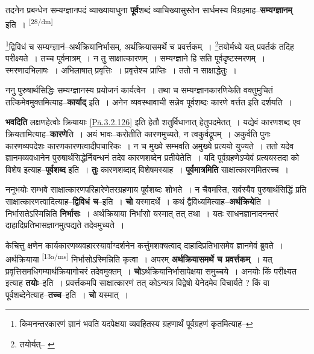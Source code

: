 \documentclass[article,12pt,a4paper]{memoir}
\begin{document}
	  \pstart तदनेन प्रबन्धेन सम्यग्ज्ञानपदं व्याख्यायाधुना \textbf{पूर्व}शब्दं व्याचिख्यासुस्तेन सार्धमस्य विग्रहमाह--\textbf{सम्यग्ज्ञानम्} इति ।
	\pend
      \leavevmode\textsuperscript{\rmlatinfont\tiny [28/dm]}

	  \pstart \footnote{किमनन्तरकारणं ज्ञानं भवति यदपेक्षया व्यवहितस्य ग्रहणार्थं पूर्वग्रहणं कृतमित्याह--\cite{dp-msD-n}}द्विविधं च सम्यग्ज्ञानं--अर्थक्रियानिर्भासम्, अर्थक्रियासमर्थे च प्रवर्त्तकम् । \footnote{तयोर्यत्--\cite{dp-msA} \cite{dp-edP} \cite{dp-edH} \cite{dp-edE} \cite{dp-edN}}तयोर्मध्ये यत् प्रवर्तकं तदिह परीक्ष्यते । तच्च पूर्वमात्रम् । न तु साक्षात्कारणम् । सम्यग्ज्ञाने हि सति पूर्वदृष्टस्मरणम् । स्मरणादभिलाषः । अभिलाषात् प्रवृत्तिः । प्रवृत्तेश्च प्राप्तिः । ततो न साक्षाद्धेतुः ।
	\pend
      

	  \pstart ननु पुरुषार्थसिद्धिः सम्यग्ज्ञानस्य प्रयोजनं कार्यत्वेन । तथा च सम्यग्ज्ञानकारणिकेति वक्तुमुचितं तत्किमेवमुक्तमित्याह--\textbf{कार्याद्} इति । अनेन व्यवस्थावाची सन्नेव पूर्वशब्दः कारणे वर्त्तत इति दर्शयति ।
	\pend
      

	  \pstart \textbf{भवदिति} लक्षणहेत्वोः क्रियायाः \cref{Pā.3.2.126} इति हेतौ शतुर्विधानात् हेतुपदमेतत् । यद्येवं कारणशब्द एव क्रियतामित्याह--\textbf{कारणे}ति । अयं भावः--करोतीति कारणमुच्यते, न त्वकुर्वद्रूपम् । अकुर्वति पुनः कारणव्यपदेशः कारणकारणत्वादीपचारिकः । न च मुख्ये सम्भवति अमुख्ये प्रत्ययो युज्यते । ततो यदेव ज्ञानमव्यवधानेन पुरुषार्थसिद्धेर्निबन्धनं तदेव कारणशब्देन प्रतीयेतेति । यदि पूर्वग्रहणेऽप्येवं प्रत्ययस्तदा को विशेष इत्याह--\textbf{पूर्वशब्द} इति । \textbf{तुः} कारणशब्दाद् विशेषमस्याह । \textbf{पूर्वमात्रमिति} साक्षात्कारणमितरच्च ।
	\pend
      

	  \pstart ननूभयोः सम्भवे साक्षात्कारणपरिहारेणेतरग्रहणाय पूर्वशब्दः शोभते । न चैवमस्ति, सर्वस्यैव पुरुषार्थसिद्धिं प्रति साक्षात्कारणत्वादित्याह--\textbf{द्विविधं च}--इति । \textbf{चो} यस्मादर्थे । कथं द्वैविध्यमित्याह--\textbf{अर्थक्रिये}ति । निर्भासतेऽस्मिन्निति \textbf{निर्भासः} । अर्थक्रियाया निर्भासो यस्मात् तत् तथा । यतः साधनज्ञानादनन्तरं दाहादिप्रतिभासज्ञानमुत्पद्यते तदेवमुच्यते ।
	\pend
      

	  \pstart केचित्तु क्षणेन कार्यकारणव्यवहारस्यार्वाग्दर्शनेन कर्त्तुमशक्यत्वाद् दाहादिप्रतिभासमेव ज्ञानमेवं ब्रुवते । अर्थक्रियाया \leavevmode\textsuperscript{\rmlatinfont\tiny [13a/ms]} निर्भासोऽस्मिन्निति कृत्वा । अपरम् \textbf{अर्थक्रियासमर्थे च प्रवर्त्तकम्} । यत् प्रवृत्तिसमधिगम्यार्थक्रियागोचरं तदेवमुक्तम् । \textbf{चो}ऽर्थक्रियानिर्भासापेक्षया समुच्चये । अनयोः किं परीक्ष्यत इत्याह \textbf{तयोः}--इति । प्रवर्त्तकमपि साक्षात्कारणं तत् कोऽन्यत्र विद्वेषो येनेदमेव विचार्यते ? किं वा पूर्वशब्देनेत्याह--\textbf{तच्च}--इति । \textbf{चो} यस्मात् ।
	\pend
      
\end{document}
